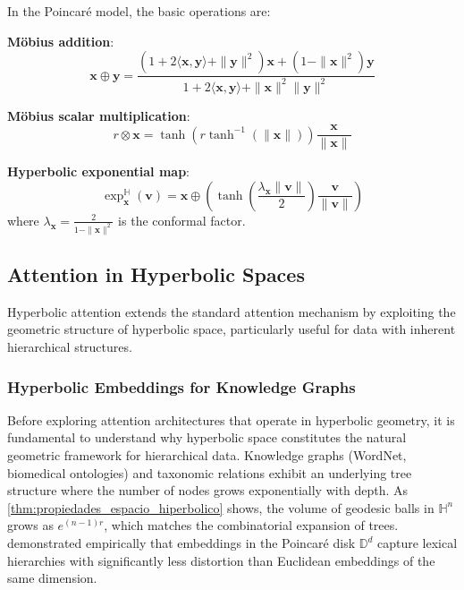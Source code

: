 \begin{definition}\label{def:operaciones_hiperbolicas}
In the Poincaré model, the basic operations are:

\textbf{Möbius addition}:
\begin{equation}
\mathbf{x} \oplus \mathbf{y} = \frac{(1+2\langle\mathbf{x},\mathbf{y}\rangle+\|\mathbf{y}\|^2)\mathbf{x} + (1-\|\mathbf{x}\|^2)\mathbf{y}}{1+2\langle\mathbf{x},\mathbf{y}\rangle+\|\mathbf{x}\|^2\|\mathbf{y}\|^2}
\end{equation}

\textbf{Möbius scalar multiplication}:
\begin{equation}
r \otimes \mathbf{x} = \tanh(r \tanh^{-1}(\|\mathbf{x}\|)) \frac{\mathbf{x}}{\|\mathbf{x}\|}
\end{equation}

\textbf{Hyperbolic exponential map}:
\begin{equation}
\exp_{\mathbf{x}}^{\mathbb{H}}(\mathbf{v}) = \mathbf{x} \oplus \left(\tanh\left(\frac{\lambda_{\mathbf{x}} \|\mathbf{v}\|}{2}\right) \frac{\mathbf{v}}{\|\mathbf{v}\|}\right)
\end{equation}
where $\lambda_{\mathbf{x}} = \frac{2}{1-\|\mathbf{x}\|^2}$ is the conformal factor.
\end{definition}

\subsection{Attention in Hyperbolic Spaces}

Hyperbolic attention extends the standard attention mechanism by exploiting the geometric structure of hyperbolic space, particularly useful for data with inherent hierarchical structures.

\subsubsection{Hyperbolic Embeddings for Knowledge Graphs}
\label{subsubsec:embeddings_hiperbolicos_grafos}

Before exploring attention architectures that operate in hyperbolic geometry, it is fundamental to understand why hyperbolic space constitutes the natural geometric framework for hierarchical data. Knowledge graphs (WordNet, biomedical ontologies) and taxonomic relations exhibit an underlying tree structure where the number of nodes grows exponentially with depth. As \autoref{thm:propiedades_espacio_hiperbolico} shows, the volume of geodesic balls in $\mathbb{H}^n$ grows as $e^{(n-1)r}$, which matches the combinatorial expansion of trees. \citet{nickel2017poincare} demonstrated empirically that embeddings in the Poincaré disk $\mathbb{D}^d$ capture lexical hierarchies with significantly less distortion than Euclidean embeddings of the same dimension.


